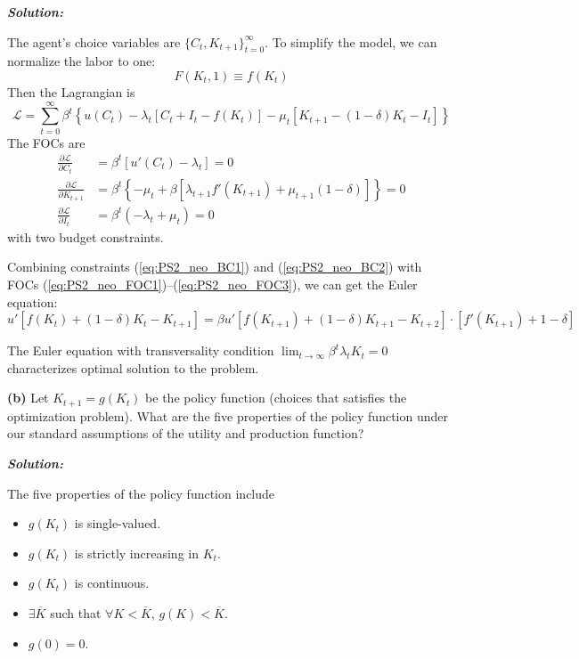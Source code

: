 \documentclass[12pt, letterpaper]{article}
\newcommand{\medp}[1]{\left[#1\right]}
\newcommand{\bgp}[1]{\left\{#1\right\}}
\begin{document}
\begin{shaded}
\noindent\textbf{\textit{Solution:}}\par
The agent's choice variables are $\{C_t, K_{t+1}\}_{t=0}^{\infty}$. To simplify the model, we can normalize the labor to one:
\begin{equation*}
    F(K_t, 1) \equiv f(K_t)
\end{equation*}
Then the Lagrangian is
\begin{equation*}
    \mathcal{L} = \sum_{t=0}^{\infty} \beta^t \bgp{u(C_t) - \lambda_t\medp{C_t + I_t - f(K_t)} - \mu_t\medp{K_{t+1} - (1-\delta) K_t - I_t}}
\end{equation*}
The FOCs are
\begin{align}
    \frac{\partial \mathcal{L}}{\partial C_t} & = \beta^t [u'(C_t) - \lambda_t] = 0 \label{eq:PS2_neo_FOC1} \\[5pt]
    \frac{\partial \mathcal{L}}{\partial K_{t+1}} & = \beta^t \bgp{ -\mu_t + \beta\medp{ \lambda_{t+1} f'(K_{t+1}) + \mu_{t+1}(1-\delta) } } = 0 \label{eq:PS2_neo_FOC2} \\[5pt]
    \frac{\partial \mathcal{L}}{\partial I_t} & = \beta^t (-\lambda_t + \mu_t) = 0 \label{eq:PS2_neo_FOC3}
\end{align}
with two budget constraints.

Combining constraints (\ref{eq:PS2_neo_BC1}) and (\ref{eq:PS2_neo_BC2}) with FOCs (\ref{eq:PS2_neo_FOC1})--(\ref{eq:PS2_neo_FOC3}), we can get the Euler equation:
\begin{equation*}
    u'[f(K_t) + (1-\delta)K_t - K_{t+1}] = \beta u'[f(K_{t+1}) + (1-\delta)K_{t+1} - K_{t+2}] \cdot [f'(K_{t+1}) + 1 - \delta]
\end{equation*}

The Euler equation with transversality condition $\lim_{t \to \infty} \beta^t \lambda_t K_t = 0$ characterizes optimal solution to the problem.
\end{shaded}


\vspace{1em}
\noindent\textbf{(b)} Let $K_{t+1} = g(K_t)$ be the policy function (choices that satisfies the optimization problem). What are the five properties of the policy function under our standard assumptions of the utility and production function?

\begin{shaded}
\noindent\textbf{\textit{Solution:}}\par
The five properties of the policy function include
\begin{itemize}
    \item $g(K_t)$ is single-valued.
    \item $g(K_t)$ is strictly increasing in $K_t$.
    \item $g(K_t)$ is continuous.
    \item $\exists \overline{K}$ such that $\forall K < \overline{K}$, $g(K) < \overline{K}$.
    \item $g(0) = 0$.
\end{itemize}
\end{shaded}
\end{document}
